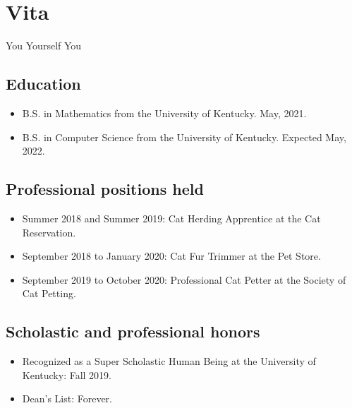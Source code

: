 \documentclass{uk_thesis} %
\begin{document}
\pagebreak

\chapter{Vita}

    \begin{center}You Yourself You\end{center}

    \section*{Education}

      \begin{itemize}
        \item B.S. in Mathematics from the University of Kentucky. May, 2021.
        \item B.S. in Computer Science from the University of Kentucky. Expected May, 2022.
      \end{itemize}


    \section*{Professional positions held}

        \begin{itemize}
            \item Summer 2018 and Summer 2019: Cat Herding Apprentice at the Cat Reservation.
            \item September 2018 to January 2020: Cat Fur Trimmer at the Pet Store.
            \item September 2019 to October 2020: Professional Cat Petter at the Society of Cat Petting.
        \end{itemize}

    \section*{Scholastic and professional honors}

        \begin{itemize}
            \item Recognized as a Super Scholastic Human Being at the University of Kentucky: Fall 2019.
            \item Dean's List: Forever.
        \end{itemize}
\end{document}
